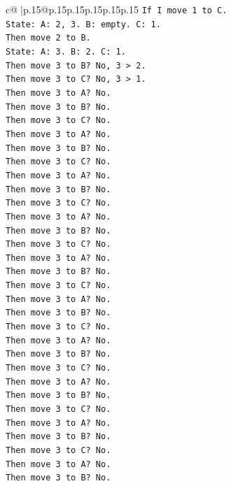 \documentclass{article}
\begin{document}
{\begin{supertabular}{c@{$\;$}|p{.15\linewidth}@{}p{.15\linewidth}p{.15\linewidth}p{.15\linewidth}p{.15\linewidth}p{.15\linewidth}}
{{{\texttt{If I move 1 to C.} \\
\texttt{State: A: 2, 3. B: empty. C: 1.} \\
\texttt{Then move 2 to B.} \\
\texttt{State: A: 3. B: 2. C: 1.} \\
\texttt{Then move 3 to B? No, 3 > 2.} \\
\texttt{Then move 3 to C? No, 3 > 1.} \\
\texttt{Then move 3 to A? No.} \\
\texttt{Then move 3 to B? No.} \\
\texttt{Then move 3 to C? No.} \\
\texttt{Then move 3 to A? No.} \\
\texttt{Then move 3 to B? No.} \\
\texttt{Then move 3 to C? No.} \\
\texttt{Then move 3 to A? No.} \\
\texttt{Then move 3 to B? No.} \\
\texttt{Then move 3 to C? No.} \\
\texttt{Then move 3 to A? No.} \\
\texttt{Then move 3 to B? No.} \\
\texttt{Then move 3 to C? No.} \\
\texttt{Then move 3 to A? No.} \\
\texttt{Then move 3 to B? No.} \\
\texttt{Then move 3 to C? No.} \\
\texttt{Then move 3 to A? No.} \\
\texttt{Then move 3 to B? No.} \\
\texttt{Then move 3 to C? No.} \\
\texttt{Then move 3 to A? No.} \\
\texttt{Then move 3 to B? No.} \\
\texttt{Then move 3 to C? No.} \\
\texttt{Then move 3 to A? No.} \\
\texttt{Then move 3 to B? No.} \\
\texttt{Then move 3 to C? No.} \\
\texttt{Then move 3 to A? No.} \\
\texttt{Then move 3 to B? No.} \\
\texttt{Then move 3 to C? No.} \\
\texttt{Then move 3 to A? No.} \\
\texttt{Then move 3 to B? No.} \\
}}}
\end{supertabular}}
\end{document}
